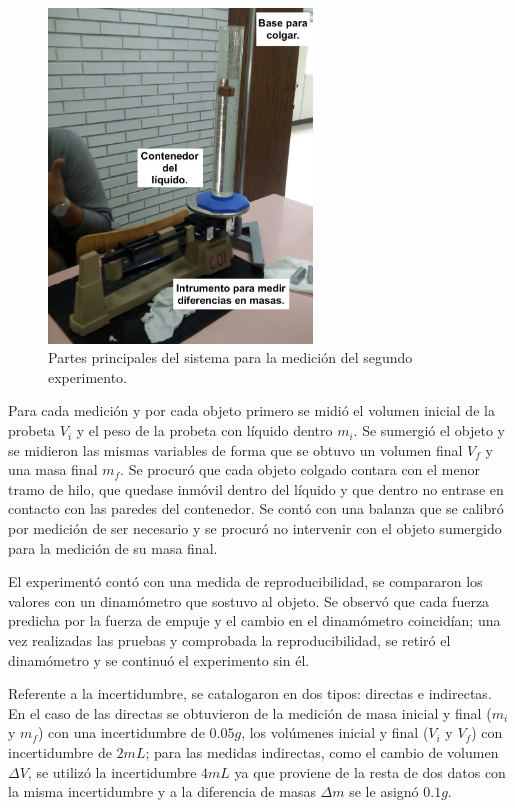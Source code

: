 \documentclass[a4paper]{article}
\begin{document}
\begin{figure}[H]
    \centering
    \includegraphics[width=7cm]{sis2.jpeg}
    \caption{Partes principales del sistema para la medición del segundo experimento.}
\end{figure}

Para cada medición y  por cada objeto primero se midió el volumen inicial de la probeta $V_i$ y el peso de la probeta con líquido dentro $m_i$. Se sumergió el objeto y se midieron las mismas variables de forma que se obtuvo un volumen final $V_f$ y una masa final $m_f$.
Se procuró que cada objeto colgado contara con el menor tramo de hilo, que quedase inmóvil dentro del líquido y que dentro no entrase en contacto con las paredes del contenedor. Se contó con una balanza que se calibró por medición de ser necesario y se procuró no intervenir con el objeto sumergido para la medición de su masa final.

El experimentó contó con una medida de reproducibilidad, se compararon los valores con un dinamómetro que sostuvo al objeto. Se observó que cada fuerza predicha por la fuerza de empuje y el cambio en el dinamómetro coincidían; una vez realizadas las pruebas y comprobada la reproducibilidad, se retiró el dinamómetro y se continuó el experimento sin él.

Referente a la incertidumbre, se catalogaron en dos tipos: directas e indirectas. En el caso de las directas se obtuvieron de la medición de masa inicial y final ($m_i$ y $m_f$) con una incertidumbre de $0.05 g$, los volúmenes inicial y final ($V_i$ y $V_f$) con incertidumbre de $2 mL$; para las medidas indirectas, como el cambio de volumen $\Delta V$, se utilizó la incertidumbre $4 mL$ ya que proviene de la resta de dos datos con la misma incertidumbre y a la diferencia de masas $\Delta m$ se le asignó $0.1 g$.
\end{document}

